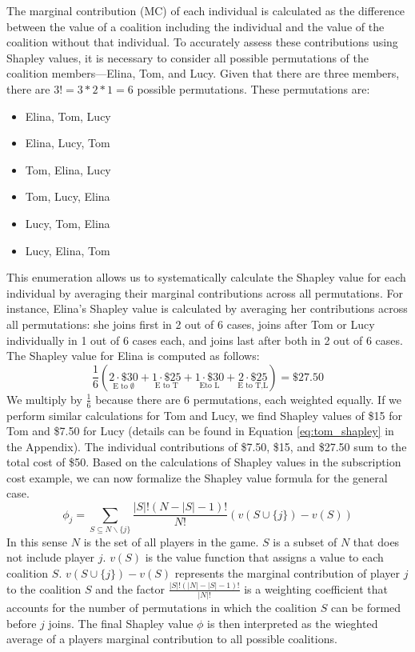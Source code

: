 \documentclass[12pt]{article}
\begin{document}
	The marginal contribution (MC) of each individual is calculated as the difference between the value of a coalition including the individual and the value of the coalition without that individual. To accurately assess these contributions using Shapley values, it is necessary to consider all possible permutations of the coalition members—Elina, Tom, and Lucy. Given that there are three members, there are $ 3! = 3 * 2 * 1 = 6$ possible permutations. These permutations are: 
	\begin{itemize}
		\item Elina, Tom, Lucy
		\item Elina, Lucy, Tom
		\item Tom, Elina, Lucy
		\item Tom, Lucy, Elina
		\item Lucy, Tom, Elina
		\item Lucy, Elina, Tom
	\end{itemize}
	This enumeration allows us to systematically calculate the Shapley value for each individual by averaging their marginal contributions across all permutations. 
	For instance, Elina's Shapley value is calculated by averaging her contributions across all permutations: she joins first in 2 out of 6 cases, joins after Tom or Lucy individually in 1 out of 6 cases each, and joins last after both in 2 out of 6 cases. The Shapley value for Elina is computed as follows:
	$$
	\frac{1}{6} \left( 
	\underset{\text{E to } \emptyset}{2 \cdot \$30} + 
	\underset{\text{E to T}}{1 \cdot \$25} + 
	\underset{\text{Eto L}}{1 \cdot \$30} + 
	\underset{\text{E to T,L}}{2 \cdot \$25} 
	\right) = \$27.50
	$$
	We multiply by $\frac{1}{6}$ because there are 6 permutations, each weighted equally. If we perform similar calculations for Tom and Lucy, we find Shapley values of \$15 for Tom and \$7.50 for Lucy (details can be found in Equation \ref{eq:tom_shapley} in the Appendix). The individual contributions of \$7.50, \$15, and \$27.50 sum to the total cost of \$50. 
	Based on the calculations of Shapley values in the subscription cost example, we can now formalize the Shapley value formula for the general case.
	\begin{equation}
		\phi_j = \sum_{S \subseteq N\backslash\{j\}} \frac{|S|!(N - |S| - 1)!}{N!}(v(S \cup \{j\}) - v(S)) 
	\end{equation}
In this sense \(N\) is the set of all players in the game. \(S\) is a subset of \(N\) that does not include player \(j\). \(v(S)\) is the value function that assigns a value to each coalition \(S\).
 \(v(S \cup \{j\}) - v(S)\) represents the marginal contribution of player \(j\) to the coalition \(S\) and the factor \(\frac{|S|!(|N| - |S| - 1)!}{|N|!}\) is a weighting coefficient that accounts for the number of permutations in which the coalition \(S\) can be formed before \(j\) joins.
The final Shapley value $\phi$ is then interpreted as the wieghted average of a players marginal contribution to all possible coalitions. 
\end{document}
